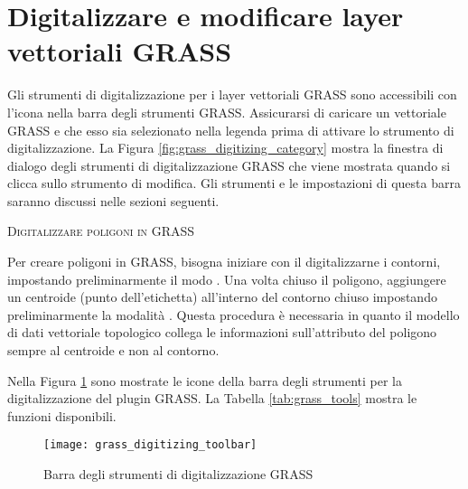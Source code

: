 \section{Digitalizzare e modificare layer vettoriali GRASS}\label{grass_digitising}

Gli strumenti di digitalizzazione per i layer vettoriali GRASS sono
accessibili con l'icona 
nella barra degli strumenti GRASS. Assicurarsi di caricare un vettoriale GRASS e che esso
sia selezionato nella legenda prima di attivare lo strumento di
digitalizzazione. La Figura \ref{fig:grass_digitizing_category} mostra la
finestra di dialogo degli strumenti di digitalizzazione GRASS che viene mostrata quando
si clicca sullo strumento di modifica. Gli strumenti e le impostazioni di
questa barra saranno discussi nelle sezioni seguenti.

\begin{Tip}\caption{\textsc{Digitalizzare poligoni in GRASS}}
Per creare poligoni in GRASS, bisogna iniziare con il digitalizzarne i
contorni, impostando preliminarmente il modo .
Una volta chiuso il poligono, aggiungere un centroide (punto
dell'etichetta) all'interno del contorno chiuso impostando preliminarmente
la modalità .
Questa procedura è necessaria in quanto il modello di dati vettoriale
topologico collega le informazioni sull'attributo del poligono sempre al
centroide e non al contorno.
\end{Tip} 

\label{label_grasstoolbar}

Nella Figura \ref{fig:grass_digitizing_toolbar} sono mostrate le icone della
barra degli strumenti per la digitalizzazione del plugin GRASS. La
Tabella \ref{tab:grass_tools} mostra le funzioni disponibili.

\begin{figure}[h]
   \centering
   \texttt{[image: grass\_digitizing\_toolbar]}
   \caption{Barra degli strumenti di digitalizzazione GRASS \nixcaption}\label{fig:grass_digitizing_toolbar}
\end{figure}

